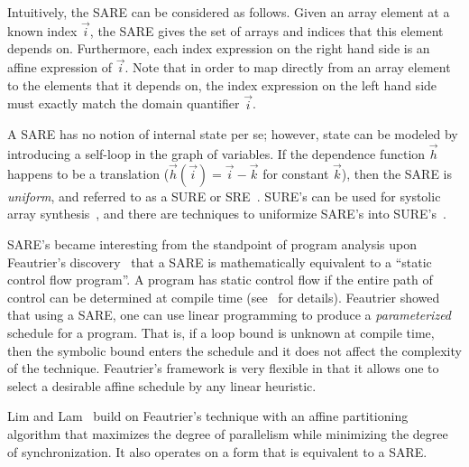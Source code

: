Intuitively, the SARE can be considered as follows.  Given an array
element at a known index $\vec i$, the SARE gives the set of arrays
and indices that this element depends on.  Furthermore, each index
expression on the right hand side is an affine expression of $\vec i$.
Note that in order to map directly from an array element to the
elements that it depends on, the index expression on the left hand
side must exactly match the domain quantifier $\vec i$.

A SARE has no notion of internal state per se; however, state can be
modeled by introducing a self-loop in the graph of variables.  If the
dependence function ${\vec h}$ happens to be a translation (${\vec
h}({\vec i}) = {\vec i} - {\vec k}$ for constant ${\vec k}$), then the
SARE is {\it uniform}, and referred to as a SURE or
SRE~\cite{Karp67}. SURE's can be used for systolic array
synthesis~\cite{Quinton84}, and there are techniques to uniformize
SARE's into SURE's~\cite{Manjun00}.

SARE's became interesting from the standpoint of program analysis upon
Feautrier's discovery~\cite{Feautrier92i,Feautrier92ii} that a SARE is
mathematically equivalent to a ``static control flow program''.  A
program has static control flow if the entire path of control can be
determined at compile time (see~\cite{Feautrier92i,DRV00} for
details).  Feautrier showed that using a SARE, one can use linear
programming to produce a {\it parameterized} schedule for a program.
That is, if a loop bound is unknown at compile time, then the symbolic
bound enters the schedule and it does not affect the complexity of the
technique.  Feautrier's framework is very flexible in that it allows
one to select a desirable affine schedule by any linear heuristic.

Lim and Lam~\cite{Lim01} build on Feautrier's technique with an affine
partitioning algorithm that maximizes the degree of parallelism while
minimizing the degree of synchronization.  It also operates on a form
that is equivalent to a SARE.
